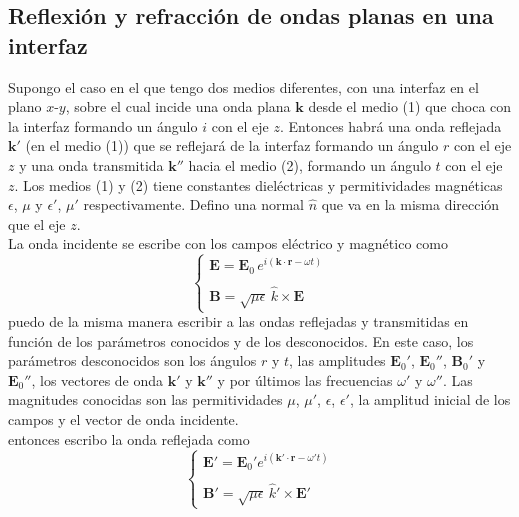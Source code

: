 \subsection{Reflexión y refracción de ondas planas en una interfaz}
Supongo el caso en el que tengo dos medios diferentes, con una interfaz en el plano $x$-$y$, sobre el cual incide una onda plana $\textbf{k}$ desde el medio (1) que choca con la interfaz formando un ángulo $i$ con el eje $z$. Entonces habrá una onda reflejada $\textbf{k}'$ (en el medio (1)) que se reflejará de la interfaz formando un ángulo $r$ con el eje $z$ y una onda transmitida $\textbf{k}''$ hacia el medio (2), formando un ángulo $t$ con el eje $z$. Los medios (1) y (2) tiene constantes dieléctricas y permitividades magnéticas $\epsilon$, $\mu$ y $\epsilon'$, $\mu'$ respectivamente. Defino una normal $\hat{n}$ que va en la misma dirección que el eje $z$.\\
\indent La onda incidente se escribe con los campos eléctrico y magnético como
\begin{equation*}
    \left\{
        \begin{matrix}
            \textbf{E} = \textbf{E}_{0}\,e^{i(\textbf{k}\cdot \textbf{r} - \omega t)}\\
            \\
            \textbf{B} = \sqrt{\mu\epsilon}\,\hat{k}\times \textbf{E}
        \end{matrix}
    \right.
\end{equation*}
puedo de la misma manera escribir a las ondas reflejadas y transmitidas en función de los parámetros conocidos y de los desconocidos. En este caso, los parámetros desconocidos son los ángulos $r$ y $t$, las amplitudes $\textbf{E}_{0}'$, $\textbf{E}_{0}''$, $\textbf{B}_{0}'$ y $\textbf{E}_{0}''$, los vectores de onda $\textbf{k}'$ y $\textbf{k}''$ y por últimos las frecuencias $\omega'$ y $\omega''$. Las magnitudes conocidas son las permitividades $\mu$, $\mu'$, $\epsilon$, $\epsilon'$, la amplitud inicial de los campos y el vector de onda incidente.\\
\indent entonces escribo la onda reflejada como
\begin{equation*}
    \left\{
        \begin{matrix}
            \textbf{E}' = \textbf{E}_{0}'e^{i(\textbf{k}'\cdot \textbf{r} - \omega' t)}\\
            \\
            \textbf{B}' = \sqrt{\mu\epsilon}\,\hat{k}'\times \textbf{E}'
        \end{matrix}
    \right.
\end{equation*}
